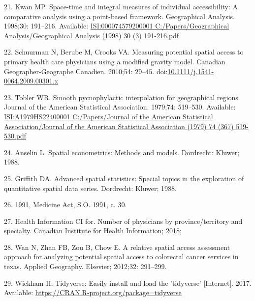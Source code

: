 \documentclass[10pt,letterpaper]{article}
\begin{document}
\hypertarget{ref-Kwan1998}{}
21. Kwan MP. Space-time and integral measures of individual
accessibility: A comparative analysis using a point-based framework.
Geographical Analysis. 1998;30: 191--216. Available:
\href{ISI:000074579200001\%0AC:/Papers/Geographical\%20Analysis/Geographical\%20Analysis\%20(1998)\%2030\%20(3)\%20191-216.pdf}{ISI:000074579200001
C:/Papers/Geographical Analysis/Geographical Analysis (1998) 30 (3) 191-216.pdf}

\hypertarget{ref-Schuurman2010}{}
22. Schuurman N, Berube M, Crooks VA. Measuring potential spatial access
to primary health care physicians using a modified gravity model.
Canadian Geographer-Geographe Canadien. 2010;54: 29--45.
doi:\href{https://doi.org/10.1111/j.1541-0064.2009.00301.x}{10.1111/j.1541-0064.2009.00301.x}

\hypertarget{ref-Tobler1979}{}
23. Tobler WR. Smooth pycnophylactic interpolation for geographical
regions. Journal of the American Statistical Association. 1979;74:
519--530. Available:
\href{ISI:A1979HS22400001\%0AC:/Papers/Journal\%20of\%20the\%20American\%20Statistical\%20Association/Journal\%20of\%20the\%20American\%20Statistical\%20Association\%20(1979)\%2074\%20(367)\%20519-530.pdf}{ISI:A1979HS22400001
C:/Papers/Journal of the American Statistical Association/Journal of the American Statistical Association (1979) 74 (367) 519-530.pdf}

\hypertarget{ref-Anselin1988}{}
24. Anselin L. Spatial econometrics: Methods and models. Dordrecht:
Kluwer; 1988.

\hypertarget{ref-Griffith1988}{}
25. Griffith DA. Advanced spatial statistics: Special topics in the
exploration of quantitative spatial data series. Dordrecht: Kluwer;
1988.

\hypertarget{ref-Ontario1991}{}
26. 1991, Medicine Act, S.O. 1991, c. 30.

\hypertarget{ref-CIHI2018}{}
27. Health Information CI for. Number of physicians by
province/territory and specialty. Canadian Institute for Health
Information; 2018;

\hypertarget{ref-Wan2012SPAR}{}
28. Wan N, Zhan FB, Zou B, Chow E. A relative spatial access assessment
approach for analyzing potential spatial access to colorectal cancer
services in texas. Applied Geography. Elsevier; 2012;32: 291--299.

\hypertarget{ref-Wickham2017tidy}{}
29. Wickham H. Tidyverse: Easily install and load the 'tidyverse'
{[}Internet{]}. 2017. Available:
\url{https://CRAN.R-project.org/package=tidyverse}
\end{document}

